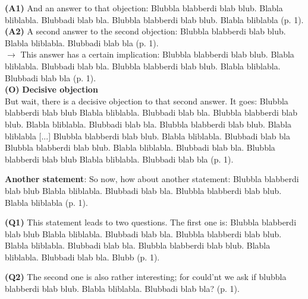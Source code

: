 \documentclass[10pt,a4paper,draft]{report}
\begin{document}
\setlength{\leftskip}{2cm}
\textbf{(A1)} And an answer to that objection: Blubbla blabberdi blab blub. Blabla bliblabla. Blubbadi blab bla. Blubbla blabberdi blab blub. Blabla bliblabla (p. 1).\\

\setlength{\leftskip}{2cm}
\textbf{(A2)} A second answer to the second objection: Blubbla blabberdi blab blub. Blabla bliblabla. Blubbadi blab bla (p. 1).\\

\setlength{\leftskip}{2cm}
$\rightarrow$ This answer has a certain implication: Blubbla blabberdi blab blub. Blabla bliblabla. Blubbadi blab bla. Blubbla blabberdi blab blub. Blabla bliblabla. Blubbadi blab bla (p. 1).\\

\setlength{\leftskip}{3cm}
\textbf{(O)} \textbf{Decisive objection}\\
But wait, there is a decisive objection to that second answer. It goes: Blubbla blabberdi blab blub Blabla bliblabla. Blubbadi blab bla. Blubbla blabberdi blab blub. Blabla bliblabla. Blubbadi blab bla. Blubbla blabberdi blab blub. Blabla bliblabla [...] Blubbla blabberdi blab blub. Blabla bliblabla. Blubbadi blab bla Blubbla blabberdi blab blub. Blabla bliblabla. Blubbadi blab bla. Blubbla blabberdi blab blub Blabla bliblabla. Blubbadi blab bla (p. 1).\\

\setlength{\leftskip}{0cm}

\textbf{Another statement}: 
So now, how about another statement: Blubbla blabberdi blab blub Blabla bliblabla. Blubbadi blab bla. Blubbla blabberdi blab blub. Blabla bliblabla  (p. 1).\\


\setlength{\leftskip}{0cm}

\textbf{(Q1)} This statement leads to two questions. The first one is: Blubbla blabberdi blab blub Blabla bliblabla. Blubbadi blab bla. Blubbla blabberdi blab blub. Blabla bliblabla. Blubbadi blab bla. Blubbla blabberdi blab blub. Blabla bliblabla. Blubbadi blab bla. Blubb  (p. 1).\\

\setlength{\leftskip}{0cm}


\setlength{\leftskip}{0cm}

\textbf{(Q2)} The second one is also rather interesting; for could’nt we ask if blubbla blabberdi blab blub. Blabla bliblabla. Blubbadi blab bla?  (p. 1).\\
\end{document}
